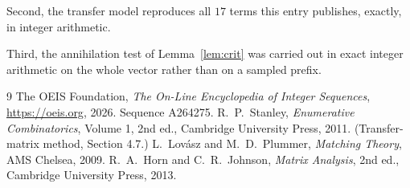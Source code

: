 \documentclass[11pt,a4paper]{article}
\theoremstyle{plain}
\theoremstyle{definition}
\begin{document}
Second, the transfer model reproduces all $17$ terms this entry publishes, exactly, in
integer arithmetic.

Third, the annihilation test of Lemma~\ref{lem:crit} was carried out in exact integer
arithmetic on the whole vector rather than on a sampled prefix.

\begin{thebibliography}{9}
 The OEIS Foundation, \emph{The On-Line Encyclopedia of Integer
Sequences}, \url{https://oeis.org}, 2026. Sequence A264275.
 R.~P.~Stanley, \emph{Enumerative Combinatorics}, Volume 1, 2nd ed.,
Cambridge University Press, 2011. (Transfer-matrix method, Section 4.7.)
 L.~Lov\'asz and M.~D.~Plummer, \emph{Matching Theory}, AMS Chelsea, 2009.
 R.~A.~Horn and C.~R.~Johnson, \emph{Matrix Analysis}, 2nd ed., Cambridge
University Press, 2013.
\end{thebibliography}
\end{document}
